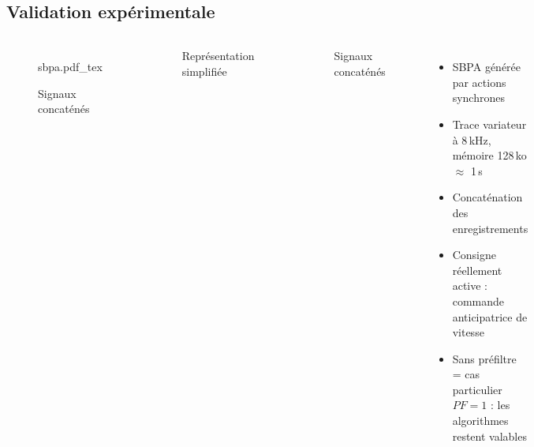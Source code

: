 \documentclass{style/presentation}
\begin{document}
\subsection{Validation expérimentale}

\begin{frame}

    \begin{columns}[c]
        \begin{figure}
            \centering
            {\fontsize{5pt}{5pt}\selectfont
                \def\svgwidth{\textwidth}
                {sbpa.pdf_tex}}
            \caption{Signaux concaténés}
        \end{figure}
        \vspace{-1.3cm}
        \begin{figure}
            \centering
            \resizebox{.8\linewidth}{!}{}
            \caption{Représentation simplifiée}
        \end{figure}
        
        \begin{figure}
            \centering
            \resizebox{\linewidth}{!}{}
            \caption{Signaux concaténés}
        \end{figure}
        \begin{itemize}
            \item SBPA générée par actions synchrones
            \item Trace variateur à 8\,kHz, mémoire 128\,ko $\approx$ 1\,s
            \item Concaténation des enregistrements
            \item Consigne réellement active : commande anticipatrice de vitesse
            \item Sans préfiltre = cas particulier $P\!F = 1$ : les algorithmes restent valables
        \end{itemize}
    \end{columns}
\end{frame}
\end{document}
